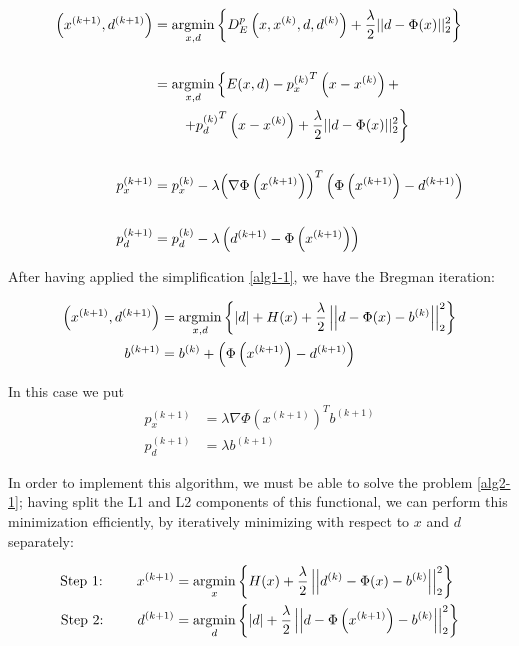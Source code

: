 \begin{align} \label{breg_iter_split}
\begin{aligned}
\left(x^{(k+1)},d^{(k+1)} \right) &= \mathop{\mathrm{argmin}}\limits_{x,d} \left\{ D^p_E \left(x,x^{(k)},d,d^{(k)}\right) + \dfrac{\lambda}{2} ||d-\Phi(x)||_2^2 \right\} \\
\\
&= \mathop{\mathrm{argmin}}\limits_{x,d} \left\{ E(x,d) - {p_x^{(k)}}^T\left(x-x^{(k)}\right) + \right. \\
&\left. \qquad + {p_d^{(k)}}^T\left(x-x^{(k)}\right)  + \dfrac{\lambda}{2}||d-\Phi(x)||_2^2 \right\} \\
\\
p_x^{(k+1)} &= p_x^{(k)} - \lambda {\left(\nabla \Phi\left(x^{(k+1)}\right)\right)}^T\left(\Phi\left(x^{(k+1)}\right)-d^{(k+1)}\right) \\
\\
p_d^{(k+1)} &= p_d^{(k)} - \lambda \left(d^{(k+1)} - \Phi\left(x^{(k+1)}\right)\right)
\end{aligned}
 \end{align}

 After having applied the simplification \eqref{alg1-1}, we have the Bregman iteration:

 \begin{align}
  \label{alg2-1} \left(x^{(k+1)},d^{(k+1)}\right) &= \mathop{\mathrm{argmin}}\limits_{x,d} \left\{ |d| + H(x) + \dfrac{\lambda}{2} \left|\left|d-\Phi(x)-b^{(k)}\right|\right|_2^2 \right\} \\
  \label{alg2-2} b^{(k+1)} &= b^{(k)} + \left(\Phi\left(x^{(k+1)}\right) - d^{(k+1)}\right)
 \end{align}

In this case we put
\begin{align*}
p_x^{(k+1)} &= \lambda \nabla \Phi\left(x^{(k+1)}\right)^T b^{(k+1)} \\
p_d^{(k+1)} &= \lambda b^{(k+1)}
\end{align*}

In order to implement this algorithm, we must be able to solve the problem \eqref{alg2-1}; having split the L1 and L2 components of this functional, we can perform this minimization efficiently, by iteratively minimizing with respect to $x$ and $d$ separately:

\begin{align}
\mbox{Step 1: }\qquad x^{(k+1)} &= \mathop{\mathrm{argmin}}\limits_x \left\{H(x) + \dfrac{\lambda}{2} \left|\left|d^{(k)}-\Phi(x) - b^{(k)}\right|\right|_2^2 \right\} \label{split-1} \\
\mbox{Step 2: }\qquad  d^{(k+1)} &= \mathop{\mathrm{argmin}}\limits_d \left\{|d| +  \dfrac{\lambda}{2} \left|\left| d - \Phi\left(x^{(k+1)}\right) - b^{(k)}\right|\right|_2^2 \right\} \label{split-2}
\end{align}

